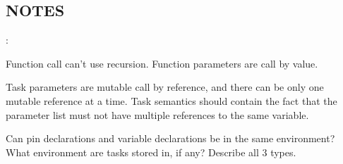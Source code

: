 \subsection{NOTES}:

Function call can't use recursion.
Function parameters are call by value.

Task parameters are mutable call by reference, and there can be only one mutable reference at a time.
Task semantics should contain the fact that the parameter list must not have multiple references to the same variable.

Can pin declarations and variable declarations be in the same environment?
What environment are tasks stored in, if any? Describe all 3 types.















